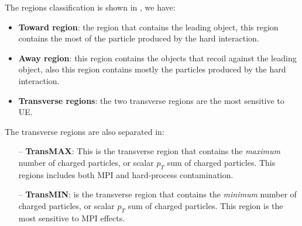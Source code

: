 The regions classification is shown in , we have:
\begin{itemize}
	\item \textbf{Toward region}: the region that contains the leading object, this region contains the most of the particle produced by the hard interaction.
	\item \textbf{Away region}: this region contains the objects that recoil against the leading object, also this region contains mostly the particles produced by the hard interaction.
	\item \textbf{Transverse regions}: the two transverse regions are the most sensitive to UE.
\end{itemize}
The transverse regions are also separated in:
\begin{itemize}
	\item[--] \textbf{TransMAX}: This is the transverse region that contains the \textit{maximum} number of charged particles, or scalar $p_T$ sum of charged particles. This regions includes both MPI and hard-process contamination.
	\item[--] \textbf{TransMIN}: is the transverse region that contains the \textit{minimum} number of charged particles, or scalar $p_T$ sum of charged particles. This region is the most  sensitive to MPI effects.
\end{itemize}



